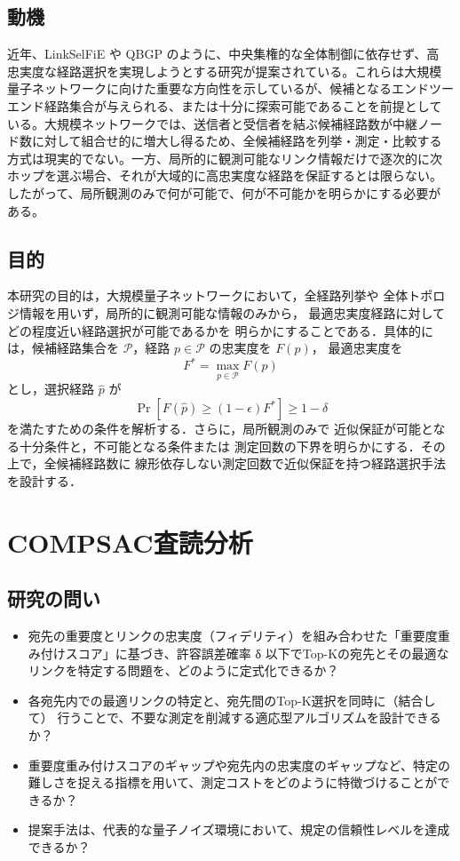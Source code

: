 \documentclass[conference]{IEEEtran}
\begin{document}
\subsection{動機}
\label{sec:org5394c58}
近年、LinkSelFiE や QBGP のように、中央集権的な全体制御に依存せず、高
忠実度な経路選択を実現しようとする研究が提案されている。これらは大規模
量子ネットワークに向けた重要な方向性を示しているが、候補となるエンドツー
エンド経路集合が与えられる、または十分に探索可能であることを前提として
いる。大規模ネットワークでは、送信者と受信者を結ぶ候補経路数が中継ノー
ド数に対して組合せ的に増大し得るため、全候補経路を列挙・測定・比較する
方式は現実的でない。一方、局所的に観測可能なリンク情報だけで逐次的に次
ホップを選ぶ場合、それが大域的に高忠実度な経路を保証するとは限らない。
したがって、局所観測のみで何が可能で、何が不可能かを明らかにする必要が
ある。

\subsection{目的}
\label{sec:orgc82b2af}
本研究の目的は，大規模量子ネットワークにおいて，全経路列挙や
全体トポロジ情報を用いず，局所的に観測可能な情報のみから，
最適忠実度経路に対してどの程度近い経路選択が可能であるかを
明らかにすることである．具体的には，候補経路集合を
\(\mathcal{P}\)，経路 \(p \in \mathcal{P}\) の忠実度を \(F(p)\)，
最適忠実度を
\[
F^\ast = \max_{p \in \mathcal{P}} F(p)
\]
とし，選択経路 \(\hat{p}\) が
\[
\Pr\left[
  F(\hat{p}) \geq (1-\epsilon)F^\ast
\right] \geq 1-\delta
\]
を満たすための条件を解析する．さらに，局所観測のみで
近似保証が可能となる十分条件と，不可能となる条件または
測定回数の下界を明らかにする．その上で，全候補経路数に
線形依存しない測定回数で近似保証を持つ経路選択手法を設計する．




\section{COMPSAC査読分析}
\label{sec:org9d2673d}
\subsection{研究の問い}
\label{sec:orgc15a0c6}

\begin{itemize}
\item 宛先の重要度とリンクの忠実度（フィデリティ）を組み合わせた「重要度重
み付けスコア」に基づき、許容誤差確率 δ 以下でTop-Kの宛先とその最適な
リンクを特定する問題を、どのように定式化できるか？

\item 各宛先内での最適リンクの特定と、宛先間のTop-K選択を同時に（結合して）
行うことで、不要な測定を削減する適応型アルゴリズムを設計できるか？

\item 重要度重み付けスコアのギャップや宛先内の忠実度のギャップなど、特定の
難しさを捉える指標を用いて、測定コストをどのように特徴づけることがで
きるか？

\item 提案手法は、代表的な量子ノイズ環境において、規定の信頼性レベルを達成できるか？
\end{itemize}
\end{document}
